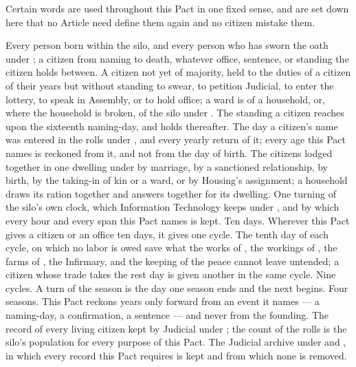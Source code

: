 Certain words are used throughout this Pact in one fixed sense, and are set down here that no Article need define them again and no citizen mistake them.

\begin{definitionlist}
 Every person born within the silo, and every person who has sworn the oath under ; a citizen from naming to death, whatever office, sentence, or standing the citizen holds between.
 A citizen not yet of majority, held to the duties of a citizen of their years but without standing to swear, to petition Judicial, to enter the lottery, to speak in Assembly, or to hold office; a ward is of a household, or, where the household is broken, of the silo under .
 The standing a citizen reaches upon the sixteenth naming-day, and holds thereafter.
 The day a citizen's name was entered in the rolls under , and every yearly return of it; every age this Pact names is reckoned from it, and not from the day of birth.
 The citizens lodged together in one dwelling under  by marriage, by a sanctioned relationship, by birth, by the taking-in of kin or a ward, or by Housing's assignment; a household draws its ration together and answers together for its dwelling.
 One turning of the silo's own clock, which Information Technology keeps under , and by which every hour and every span this Pact names is kept.
 Ten days. Wherever this Pact gives a citizen or an office ten days, it gives one cycle.
 The tenth day of each cycle, on which no labor is owed save what the works of , the workings of , the farms of , the Infirmary, and the keeping of the peace cannot leave untended; a citizen whose trade takes the rest day is given another in the same cycle.
 Nine cycles. A turn of the season is the day one season ends and the next begins.
 Four seasons. This Pact reckons years only forward from an event it names --- a naming-day, a confirmation, a sentence --- and never from the founding.
 The record of every living citizen kept by Judicial under ; the count of the rolls is the silo's population for every purpose of this Pact.
 The Judicial archive under  and , in which every record this Pact requires is kept and from which none is removed.

\end{definitionlist}
